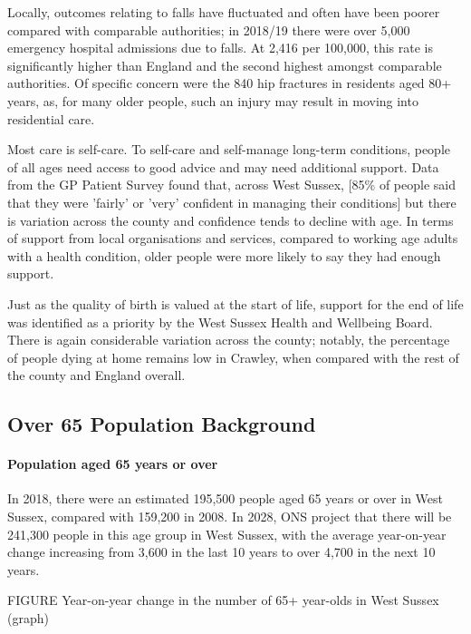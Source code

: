 Locally, outcomes relating to falls have fluctuated and often have been poorer compared with comparable authorities; in 2018/19 there were over 5,000 emergency hospital admissions due to falls. At 2,416 per 100,000, this rate is significantly higher than England and the second highest amongst comparable authorities. Of specific concern were the 840 hip fractures in residents aged 80+ years, as, for many older people, such an injury may result in moving into residential care.

Most care is self-care. To self-care and self-manage long-term conditions, people of all ages need access to good advice and may need additional support. Data from the GP Patient Survey found that, across West Sussex, [85\% of people said that they were 'fairly' or 'very' confident in managing their conditions] but there is variation across the county and confidence tends to decline with age. In terms of support from local organisations and services, compared to working age adults with a health condition, older people were more likely to say they had enough support.

Just as the quality of birth is valued at the start of life, support for the end of life was identified as a priority by the West Sussex Health and Wellbeing Board. There is again considerable variation across the county; notably, the percentage of people dying at home remains low in Crawley, when compared with the rest of the county and England overall.

\subsection{Over 65 Population Background}
\paragraph{Population aged 65 years or over} In 2018, there were an estimated 195,500 people aged 65 years or over in West Sussex, compared with 159,200 in 2008. In 2028, ONS project that there will be 241,300 people in this age group in West Sussex, with the average year-on-year change increasing from 3,600 in the last 10 years to over 4,700 in the next 10 years.

FIGURE Year-on-year change in the number of 65+ year-olds in West Sussex (graph)

